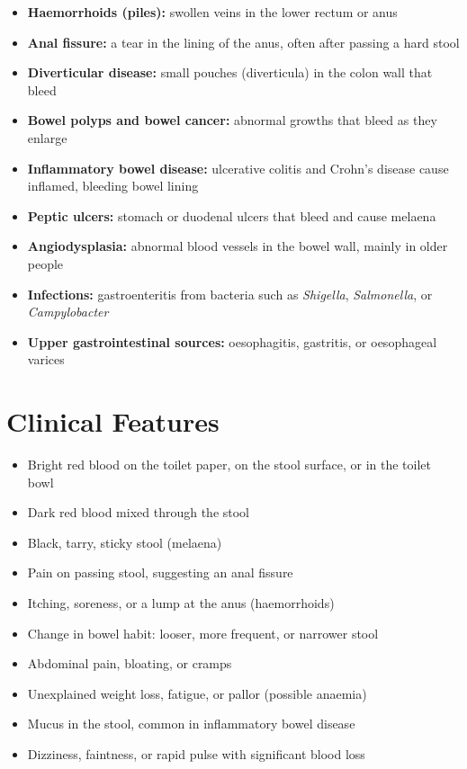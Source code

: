 \begin{itemize}
    \item \textbf{Haemorrhoids (piles):} swollen veins in the lower rectum or anus
    \item \textbf{Anal fissure:} a tear in the lining of the anus, often after passing a hard stool
    \item \textbf{Diverticular disease:} small pouches (diverticula) in the colon wall that bleed
    \item \textbf{Bowel polyps and bowel cancer:} abnormal growths that bleed as they enlarge
    \item \textbf{Inflammatory bowel disease:} ulcerative colitis and Crohn's disease cause inflamed, bleeding bowel lining
    \item \textbf{Peptic ulcers:} stomach or duodenal ulcers that bleed and cause melaena
    \item \textbf{Angiodysplasia:} abnormal blood vessels in the bowel wall, mainly in older people
    \item \textbf{Infections:} gastroenteritis from bacteria such as \textit{Shigella}, \textit{Salmonella}, or \textit{Campylobacter}
    \item \textbf{Upper gastrointestinal sources:} oesophagitis, gastritis, or oesophageal varices
\end{itemize}

\section*{Clinical Features}
\begin{itemize}
    \item Bright red blood on the toilet paper, on the stool surface, or in the toilet bowl
    \item Dark red blood mixed through the stool
    \item Black, tarry, sticky stool (melaena)
    \item Pain on passing stool, suggesting an anal fissure
    \item Itching, soreness, or a lump at the anus (haemorrhoids)
    \item Change in bowel habit: looser, more frequent, or narrower stool
    \item Abdominal pain, bloating, or cramps
    \item Unexplained weight loss, fatigue, or pallor (possible anaemia)
    \item Mucus in the stool, common in inflammatory bowel disease
    \item Dizziness, faintness, or rapid pulse with significant blood loss
\end{itemize}

